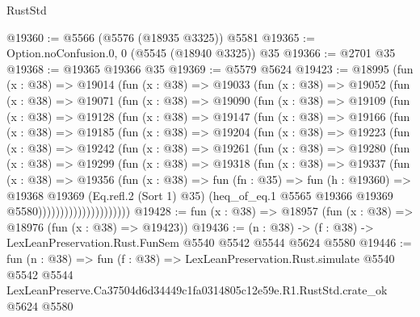 \begin{lexlean}{RustStd}
\begin{coremodule}
@19360 := @5566 (@5576 (@18935 @3325)) @5581
@19365 := Option.noConfusion.{0, 0} (@5545 (@18940 @3325)) @35
@19366 := @2701 @35
@19368 := @19365 @19366 @35
@19369 := @5579 @5624
@19423 := @18995
    (fun (x : @38) =>
    @19014
      (fun (x : @38) =>
      @19033
        (fun (x : @38) =>
        @19052
          (fun (x : @38) =>
          @19071
            (fun (x : @38) =>
            @19090
              (fun (x : @38) =>
              @19109
                (fun (x : @38) =>
                @19128
                  (fun (x : @38) =>
                  @19147
                    (fun (x : @38) =>
                    @19166
                      (fun (x : @38) =>
                      @19185
                        (fun (x : @38) =>
                        @19204
                          (fun (x : @38) =>
                          @19223
                            (fun (x : @38) =>
                            @19242
                              (fun (x : @38) =>
                              @19261
                                (fun (x : @38) =>
                                @19280
                                  (fun (x : @38) =>
                                  @19299
                                    (fun (x : @38) =>
                                    @19318
                                      (fun (x : @38) =>
                                      @19337
                                        (fun (x : @38) =>
                                        @19356
                                          (fun (x : @38) =>
                                          fun (fn : @35) =>
                                          fun (h : @19360) =>
                                          @19368
                                            @19369
                                            (Eq.refl.{2} (Sort 1) @35)
                                            (heq_of_eq.{1}
                                              @5565
                                              @19366
                                              @19369
                                              @5580)))))))))))))))))))))
@19428 := fun (x : @38) => @18957 (fun (x : @38) => @18976 (fun (x : @38) => @19423))
@19436 := (n : @38) -> (f : @38) -> LexLeanPreservation.Rust.FunSem @5540 @5542 @5544 @5624 @5580
@19446 := fun (n : @38) =>
  fun (f : @38) =>
  LexLeanPreservation.Rust.simulate
    @5540
    @5542
    @5544
    LexLeanPreserve.Ca37504d6d34449c1fa0314805c12e59e.R1.RustStd.crate_ok
    @5624
    @5580
\end{coremodule}
\end{lexlean}
